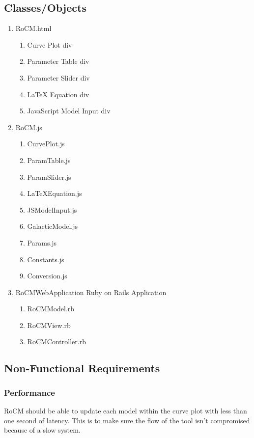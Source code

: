 \documentclass[titlepage]{article}
\begin{document}
\subsection{Classes/Objects}
\begin{enumerate}
	\item RoCM.html
    \begin{enumerate}
    	\item Curve Plot div
		\item Parameter Table div
		\item Parameter Slider div
        \item LaTeX Equation div
        \item JavaScript Model Input div
	\end{enumerate}
	\item RoCM.js
	\begin{enumerate}
    	\item CurvePlot.js
		\item ParamTable.js
		\item ParamSlider.js
        \item LaTeXEquation.js
        \item JSModelInput.js
        \item GalacticModel.js
        \item Params.js
        \item Constants.js
        \item Conversion.js
        
	\end{enumerate}
	\item RoCMWebApplication Ruby on Rails Application
	\begin{enumerate}
		\item RoCMModel.rb
		\item RoCMView.rb
		\item RoCMController.rb
	\end{enumerate}
\end{enumerate}

\subsection{Non-Functional Requirements}
\subsubsection{Performance}
RoCM should be able to update each model within the curve plot with less than one second of latency. This is to make sure the flow of the tool isn't compromised because of a slow system.
\end{document}
